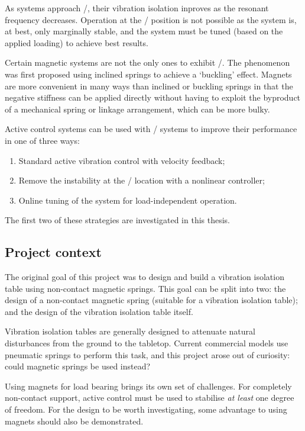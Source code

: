 As systems approach \qzs/, their vibration isolation inproves as the resonant frequency decreases.
Operation at the \qzs/ position is not possible as the system is, at best, only marginally stable, and the system must be tuned (based on the applied loading) to achieve best results.

Certain magnetic systems are not the only ones to exhibit \qzs/.
The phenomenon was first proposed using inclined springs to achieve a `buckling' effect.
Magnets are more convenient in many ways than inclined or buckling springs in that the negative stiffness can be applied directly without having to exploit the byproduct of a mechanical spring or linkage arrangement, which can be more bulky.

Active control systems can be used with \qzs/ systems to improve their  performance in one of three ways:
\begin{enumerate}
  \item Standard active vibration control with velocity feedback;
  \item Remove the instability at the \qzs/ location with a nonlinear controller;
  \item Online tuning of the system for load-independent operation.
\end{enumerate}
The first two of these strategies are investigated in this thesis.

\subsection{Project context}

The original goal of this project was to design and build a vibration isolation table using non-contact magnetic springs.
This goal can be split into two: the design of a non-contact magnetic spring (suitable for a vibration isolation table); and the design of the vibration isolation table itself.

Vibration isolation tables are generally designed to attenuate natural disturbances from the ground to the tabletop.
Current commercial models use pneumatic springs to perform this task, and this project arose out of curiosity: could magnetic springs be used instead?

Using magnets for load bearing brings its own set of challenges.
For completely non-contact support, active control must be used to stabilise \emph{at least} one degree of freedom.
For the design to be worth investigating, some advantage to using magnets should also be demonstrated.

